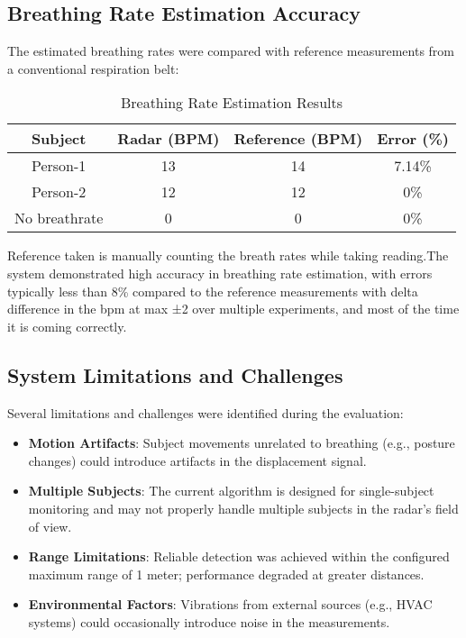 \documentclass[12pt]{article}
\begin{document}
\subsection{Breathing Rate Estimation Accuracy}
The estimated breathing rates were compared with reference measurements from a conventional respiration belt:

\begin{table}[H]
\centering
\begin{tabular}{|c|c|c|c|}
\hline
\textbf{Subject} & \textbf{Radar (BPM)} & \textbf{Reference (BPM)} & \textbf{Error (\%)} \\
\hline
Person-1 & 13 & 14 & 7.14\% \\
Person-2 & 12 & 12 & 0\% \\
No breathrate & 0 & 0 & 0\% \\
\hline
\end{tabular}
\caption{Breathing Rate Estimation Results}
\end{table}

Reference taken is manually counting the breath rates while taking reading.The system demonstrated high accuracy in breathing rate estimation, with errors typically less than 8\% compared to the reference measurements with delta difference in the bpm at max ±2 over multiple experiments, and most of the time it is coming correctly.

\subsection{System Limitations and Challenges}
Several limitations and challenges were identified during the evaluation:

\begin{itemize}
    \item \textbf{Motion Artifacts}: Subject movements unrelated to breathing (e.g., posture changes) could introduce artifacts in the displacement signal.
    
    \item \textbf{Multiple Subjects}: The current algorithm is designed for single-subject monitoring and may not properly handle multiple subjects in the radar's field of view.
    
    \item \textbf{Range Limitations}: Reliable detection was achieved within the configured maximum range of 1 meter; performance degraded at greater distances.
    
    \item \textbf{Environmental Factors}: Vibrations from external sources (e.g., HVAC systems) could occasionally introduce noise in the measurements.
\end{itemize}
\end{document}
